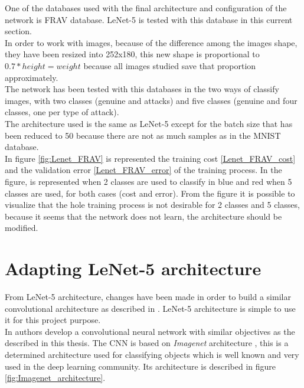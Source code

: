One of the databases used with the final architecture and configuration of the network is FRAV database. LeNet-5 is tested with this database in this current section.\\

In order to work with images, because of the difference among the images shape, they have been resized into 252x180, this new shape is proportional to $0.7*height = weight$ because all images studied save that proportion approximately.\\

The network has been tested with this databases in the two ways of classify images, with two classes (genuine and attacks) and five classes (genuine and four classes, one per type of attack).\\ %

The architecture used is the same as LeNet-5 except for the batch size that has been reduced to 50 because there are not as much samples as in the MNIST database.\\

In figure \ref{fig:Lenet_FRAV} is represented the training cost \ref{Lenet_FRAV_cost} and the validation error \ref{Lenet_FRAV_error} of the training process. In the figure, is represented when 2 classes are used to classify in  blue and red when 5 classes are used, for both cases (cost and error). From the figure it is possible to visualize that the hole training process is not desirable for 2 classes and 5 classes, because it seems that the network does not learn, the architecture should be modified.\\

\clearpage
\section{Adapting LeNet-5 architecture}
From LeNet-5 architecture, changes have been made in order to build a similar convolutional architecture as described in \cite{yangLL14}. LeNet-5 architecture is simple to use it for this project purpose.\\

In \cite{yangLL14} authors develop a convolutional neural network with similar objectives as the described in this thesis. The CNN is based on \textit{Imagenet} architecture \cite{imagenet}, this is a determined architecture used for classifying objects which is well known and very used in the deep learning community. Its architecture is described in figure \ref{fig:Imagenet_architecture}.\\

